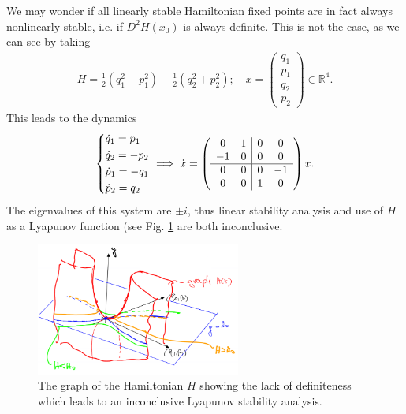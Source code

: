 We may wonder if all linearly stable Hamiltonian fixed points are in fact always nonlinearly stable, i.e. if $D^2H(x_0)$ is always definite. This is not the case, as we can see by taking
 \begin{align}
	 H = \frac{1}{2} \left(q_{1}^{2} + p_{1} ^{2}\right) - \frac{1}{2}\left( q_{2}^{2} + p_{2}^{2}\right);\quad x=
	 \begin{pmatrix}
	 	q_1 \\ p_1 \\ q_2 \\ p_2
	 \end{pmatrix}
	\in \mathbb{R}^{4}. 
\end{align}
This leads to the dynamics
\begin{align}
	\begin{dcases}
		\dot{q}_{1} = p_1 \\
		\dot{q}_2 = - p_2 \\
		\dot{p}_{1} = - q_{1} \\
		\dot{p}_{2} = q_2
	\end{dcases}
	\implies
	\dot{x}=
	\left(
	\begin{array}{ c c | c c}
		0 & 1 & 0 & 0\\
		-1 & 0 & 0 & 0 \\
		\hline
		0 & 0 & 0 & -1 \\
		0 & 0 & 1 & 0
	\end{array} 
	\right)
	x.
\end{align}
The eigenvalues of this system are $\pm i$, thus linear stability analysis and use of $H$ as a Lyapunov function (see Fig. \ref{fig:inconclusive_hamiltonian} are both inconclusive.
\begin{figure}[h!]
	\centering
	\includegraphics[width=0.6\textwidth]{figures/ch8/18inconclusive_hamiltonian.png}
	\caption{The graph of the Hamiltonian $H$ showing the lack of definiteness which leads to an inconclusive Lyapunov stability analysis.}
	\label{fig:inconclusive_hamiltonian}
\end{figure}

